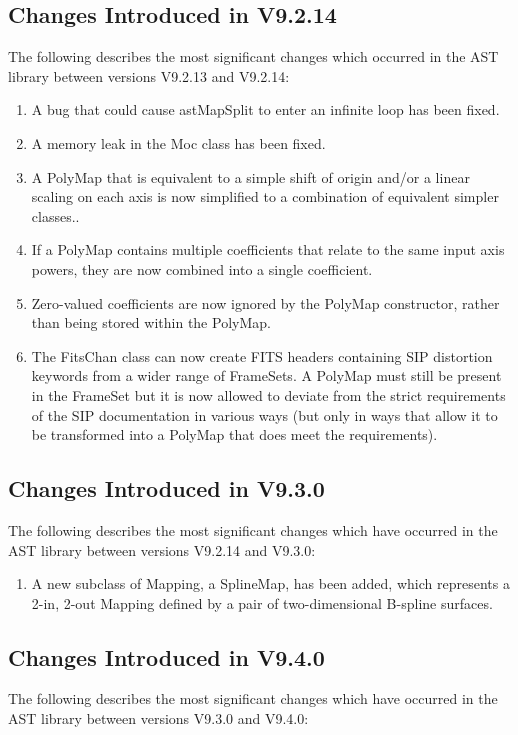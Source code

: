 \documentclass[twoside,11pt]{starlink}
\begin{document}
\subsection{Changes Introduced in V9.2.14}
The following describes the most significant changes which
occurred in the AST library between versions V9.2.13 and V9.2.14:

\begin{enumerate}

\item A bug that could cause astMapSplit to enter an infinite loop has been
  fixed.
\item A memory leak in the Moc class has been fixed.
\item A PolyMap that is equivalent to a simple shift of origin and/or a linear
  scaling on each axis is now simplified to a combination of equivalent
  simpler classes..
\item If a PolyMap contains multiple coefficients that relate to the same
  input axis powers, they are now combined into a single coefficient.
\item Zero-valued coefficients are now ignored by the PolyMap constructor,
  rather than being stored within the PolyMap.
\item The FitsChan class can now create FITS headers containing SIP
  distortion keywords from a wider range of FrameSets. A PolyMap must
  still be present in the FrameSet but it is now allowed to deviate from
  the strict requirements of the SIP documentation in various ways (but
  only in ways that allow it to be transformed into a PolyMap that does
  meet the requirements).
\end{enumerate}

\subsection{Changes Introduced in V9.3.0}
The following describes the most significant changes which have
occurred in the AST library between versions V9.2.14 and V9.3.0:

\begin{enumerate}

\item A new subclass of Mapping, a SplineMap, has been added, which
represents a 2-in, 2-out Mapping defined by a pair of two-dimensional
B-spline surfaces.

\end{enumerate}

\subsection{Changes Introduced in V9.4.0}
The following describes the most significant changes which have
occurred in the AST library between versions V9.3.0 and V9.4.0:
\end{document}
